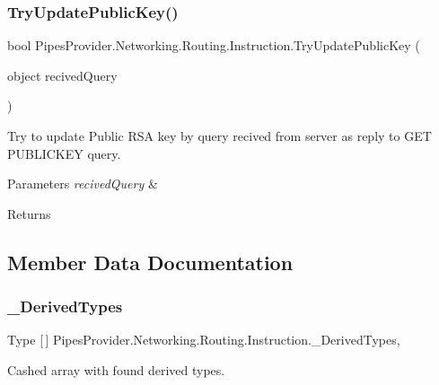 \subsubsection{\texorpdfstring{Try\+Update\+Public\+Key()}{TryUpdatePublicKey()}}
{\footnotesize\ttfamily bool Pipes\+Provider.\+Networking.\+Routing.\+Instruction.\+Try\+Update\+Public\+Key (\begin{DoxyParamCaption}\item[{object}]{recived\+Query }\end{DoxyParamCaption})}



Try to update Public R\+SA key by query recived from server as reply to G\+ET P\+U\+B\+L\+I\+C\+K\+EY query. 


\begin{DoxyParams}{Parameters}
{\em recived\+Query} & \\
\hline
\end{DoxyParams}
\begin{DoxyReturn}{Returns}

\end{DoxyReturn}


\subsection{Member Data Documentation}
\mbox{\label{class_pipes_provider_1_1_networking_1_1_routing_1_1_instruction_af4402de9adb2ac8dc18bbda83465b749}} 
\subsubsection{\texorpdfstring{\+\_\+\+Derived\+Types}{\_DerivedTypes}}
{\footnotesize\ttfamily Type \mbox{[}$\,$\mbox{]} Pipes\+Provider.\+Networking.\+Routing.\+Instruction.\+\_\+\+Derived\+Types\hspace{0.3cm}{\ttfamily [static]}, {\ttfamily [private]}}



Cashed array with found derived types. 


